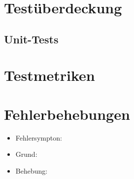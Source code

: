 \documentclass[a4paper]{scrreprt}
\begin{document}
    \chapter{Testüberdeckung}
      \section{Unit-Tests}




    \chapter{Testmetriken}




    \chapter{Fehlerbehebungen}

    \begin{itemize}
        \item Fehlersympton:
        \item Grund:
        \item Behebung:
    \end{itemize}
\end{document}
